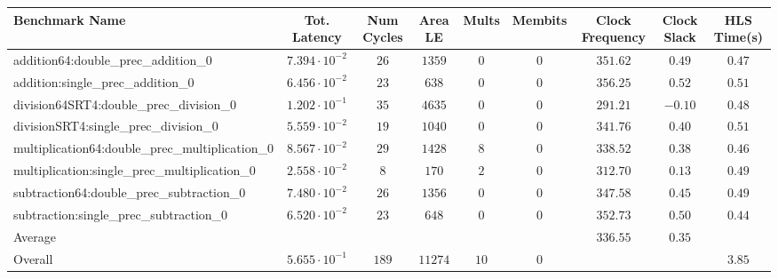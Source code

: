 \begin{tabular}{|l|c|c|c|c|c|c|c|c|}
\hline
Benchmark Name                                   & Tot. Latency            & Num Cycles & Area LE   & Mults  & Membits & Clock Frequency & Clock Slack & HLS Time(s) \\
\hline
addition64:double\_prec\_addition\_0             & $ 7.394 \cdot 10^{-2} $ & $ 26     $ & $ 1359  $ & $ 0  $ & $ 0   $ & $ 351.62      $ & $ 0.49    $ & $ 0.47    $ \\
addition:single\_prec\_addition\_0               & $ 6.456 \cdot 10^{-2} $ & $ 23     $ & $ 638   $ & $ 0  $ & $ 0   $ & $ 356.25      $ & $ 0.52    $ & $ 0.51    $ \\
division64SRT4:double\_prec\_division\_0         & $ 1.202 \cdot 10^{-1} $ & $ 35     $ & $ 4635  $ & $ 0  $ & $ 0   $ & $ 291.21      $ & $ -0.10   $ & $ 0.48    $ \\
divisionSRT4:single\_prec\_division\_0           & $ 5.559 \cdot 10^{-2} $ & $ 19     $ & $ 1040  $ & $ 0  $ & $ 0   $ & $ 341.76      $ & $ 0.40    $ & $ 0.51    $ \\
multiplication64:double\_prec\_multiplication\_0 & $ 8.567 \cdot 10^{-2} $ & $ 29     $ & $ 1428  $ & $ 8  $ & $ 0   $ & $ 338.52      $ & $ 0.38    $ & $ 0.46    $ \\
multiplication:single\_prec\_multiplication\_0   & $ 2.558 \cdot 10^{-2} $ & $ 8      $ & $ 170   $ & $ 2  $ & $ 0   $ & $ 312.70      $ & $ 0.13    $ & $ 0.49    $ \\
subtraction64:double\_prec\_subtraction\_0       & $ 7.480 \cdot 10^{-2} $ & $ 26     $ & $ 1356  $ & $ 0  $ & $ 0   $ & $ 347.58      $ & $ 0.45    $ & $ 0.49    $ \\
subtraction:single\_prec\_subtraction\_0         & $ 6.520 \cdot 10^{-2} $ & $ 23     $ & $ 648   $ & $ 0  $ & $ 0   $ & $ 352.73      $ & $ 0.50    $ & $ 0.44    $ \\
\hline
Average                                          & $                     $ & $        $ & $       $ & $    $ & $     $ & $ 336.55      $ & $ 0.35    $ & $         $ \\
\hline
Overall                                          & $ 5.655 \cdot 10^{-1} $ & $ 189    $ & $ 11274 $ & $ 10 $ & $ 0   $ & $             $ & $         $ & $ 3.85    $ \\
\hline
\end{tabular}
